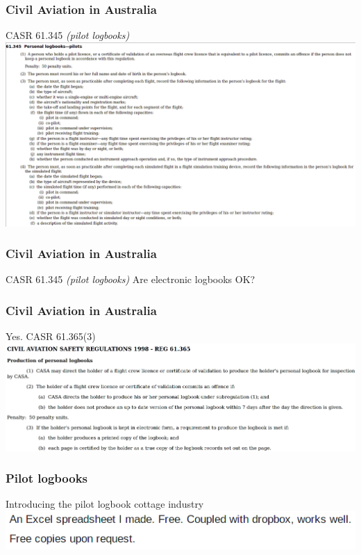 \begin{frame}
\frametitle{Civil Aviation in Australia}
\begin{block}{CASR 61.345 \emph{(pilot logbooks)}}
\includegraphics[height=0.6\textheight,natwidth=870,natheight=589]{image/casr-logbook.png}
\end{block}
\end{frame}

\begin{frame}
\frametitle{Civil Aviation in Australia}
\begin{block}{CASR 61.345 \emph{(pilot logbooks)}}
Are electronic logbooks OK?
\end{block}
\end{frame}

\begin{frame}
\frametitle{Civil Aviation in Australia}
\begin{block}{Yes. CASR 61.365(3)}
\includegraphics[height=0.3\textheight,natwidth=1871,natheight=575]{image/casr-logbook-production.png}
\end{block}
\end{frame}

\begin{frame}
\frametitle{Pilot logbooks}
\begin{block}{Introducing the pilot logbook cottage industry}
\includegraphics[height=0.1\textheight,natwidth=541,natheight=59]{image/logbook-1.png}
\end{block}
\end{frame}


